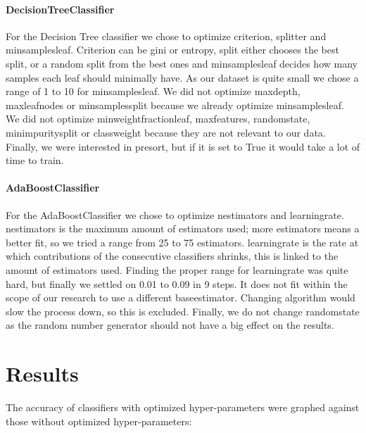 \documentclass{article}
\begin{document}
		\paragraph{DecisionTreeClassifier}
			For the Decision Tree classifier we chose to optimize criterion, splitter and min\textunderscore samples\textunderscore leaf. Criterion can be gini or entropy, split either chooses the best split, or a random split from the best ones and min\textunderscore samples\textunderscore leaf decides how many samples each leaf should minimally have. As our dataset is quite small we chose a range of 1 to 10 for min\textunderscore samples\textunderscore leaf. We did not optimize max\textunderscore depth, max\textunderscore leaf\textunderscore nodes or min\textunderscore samples\textunderscore split because we already optimize min\textunderscore samples\textunderscore leaf. We did not  optimize min\textunderscore weight\textunderscore fraction\textunderscore leaf, max\textunderscore features, random\textunderscore state, min\textunderscore impurity\textunderscore split or class\textunderscore weight because they are not relevant to our data. Finally, we were interested in presort, but if it is set to True it would take a lot of time to train.

		\paragraph{AdaBoostClassifier}
			For the AdaBoostClassifier we chose to optimize n\textunderscore estimators and learning\textunderscore rate. n\textunderscore estimators is the maximum amount of estimators used; more estimators means a better fit, so we tried a range from 25 to 75 estimators. learning\textunderscore rate is the rate at which contributions of the consecutive classifiers shrinks, this is linked to the amount of estimators used. Finding the proper range for learning\textunderscore rate was quite hard, but finally we settled on 0.01 to 0.09 in 9 steps. It does not fit within the scope of our research to use a different base\textunderscore estimator. Changing algorithm would slow the process down, so this is excluded. Finally, we do not change random\textunderscore state as the random number generator should not have a big effect on the results. 


\section{Results}

The accuracy of classifiers with optimized hyper-parameters were graphed against those without optimized hyper-parameters:
\end{document}
